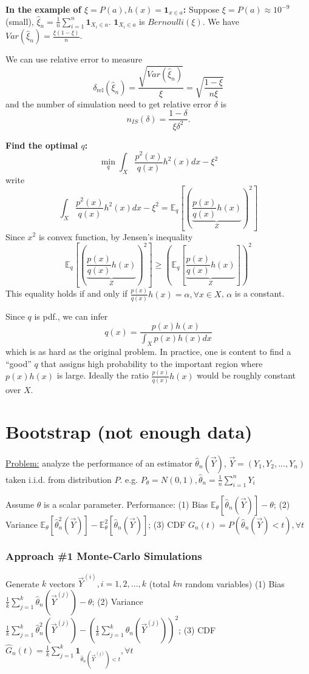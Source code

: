 \documentclass[11pt,a4paper]{article}
\begin{document}
\textbf{In the example of $\xi=P(a), h(x)=\mathbf{1}_{x\in a}$:} Suppose $\xi=P(a)\approx 10^{-9}$ (small), $\hat{\xi}_n=\frac{1}{n}\sum_{i=1}^n\mathbf{1}_{X_i\in a}$. $\mathbf{1}_{X_i\in a}$ is $Bernoulli(\xi)$. We have $Var(\hat{\xi}_n)=\frac{\xi(1-\xi)}{n}$.

We can use relative error to measure $$\delta_{\mathrm{rel}}\left(\hat{\xi}_n\right)=\frac{\sqrt{Var(\hat{\xi}_n)}}{\xi}=\sqrt{\frac{1-\xi}{n\xi}}$$
and the number of simulation need to get relative error $\delta$ is $$
n_{I S}(\delta)=\frac{1-\delta} {\xi \delta^2} .
$$

\textbf{Find the optimal $q$:}
$$\min_q\int_X\frac{p^2(x)}{q(x)}h^2(x)dx-\xi^2$$
write $$\int_X\frac{p^2(x)}{q(x)}h^2(x)dx-\xi^2=\mathbb{E}_q\left[\left(\underbrace{\frac{p(x)}{q(x)}h(x)}_{Z}\right)^2\right]$$
Since $x^2$ is convex function, by Jensen's inequality
$$\mathbb{E}_q\left[\left(\underbrace{\frac{p(x)}{q(x)}h(x)}_{Z}\right)^2\right]\geq \left(\mathbb{E}_q\left[\underbrace{\frac{p(x)}{q(x)}h(x)}_{Z}\right]\right)^2$$
This equality holds if and only if $\frac{p(x)}{q(x)}h(x)=\alpha,\forall x\in X$, $\alpha$ is a constant.

Since $q$ is pdf., we can infer $$q(x)=\frac{p(x)h(x)}{\int_Xp(x)h(x)dx}$$
which is as hard as the original problem. In practice, one is content to find a “good” $q$ that assigns high probability to the important region where $p(x)h(x)$ is large. Ideally the ratio $\frac{p(x)}{q(x)}h(x)$ would be roughly constant over $X$.


\section{Bootstrap (not enough data)}
\underline{Problem:} analyze the performance of an estimator $\hat{\theta}_n(\vec{Y})$, $\vec{Y}=(Y_1,Y_2,...,Y_n)$ taken i.i.d. from distribution $P$. e.g. $P_{\theta}=N(0,1),\hat{\theta}_n=\frac{1}{n}\sum_{i=1}^nY_i$

Assume $\theta$ is a scalar parameter. Performance: (1) Bias $\mathbb{E}_{\theta}[\hat{\theta}_n(\vec{Y})]-\theta$; (2) Variance $\mathbb{E}_{\theta}[\hat{\theta}_n^2(\vec{Y})]-\mathbb{E}_{\theta}^2[\hat{\theta}_n(\vec{Y})]$; (3) CDF $G_{n}(t)=P(\hat{\theta}_n(\vec{Y})<t),\forall t$

\subsubsection*{Approach \#1 Monte-Carlo Simulations}
Generate $k$ vectors $\vec{Y}^{(i)},i=1,2,...,k$ (total $kn$ random variables)
(1) Bias $\frac{1}{k}\sum_{j=1}^k \hat{\theta}_n(\vec{Y}^{(j)})-\theta$; (2) Variance $\frac{1}{k}\sum_{j=1}^k \hat{\theta}^2_n(\vec{Y}^{(j)})-\left(\frac{1}{k}\sum_{j=1}^k \hat{\theta}_n(\vec{Y}^{(j)})\right)^2$; (3) CDF $\hat{G}_{n}(t)=\frac{1}{k}\sum_{j=1}^k \mathbf{1}_{\hat{\theta}_n(\vec{Y}^{(j)})<t},\forall t$
\end{document}

